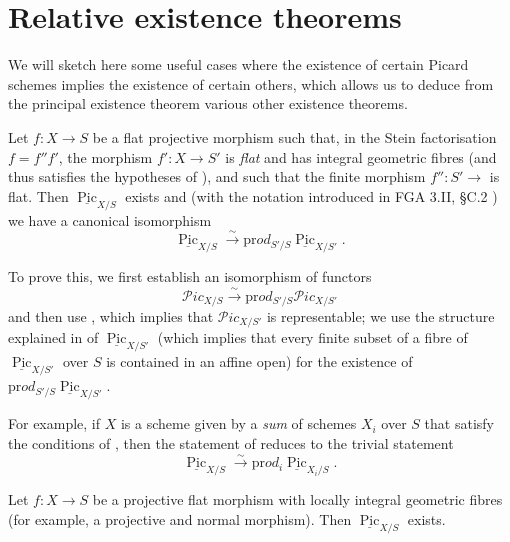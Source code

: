 \section{Relative existence theorems}\label{fga3.v-6}

We will sketch here some useful cases where the existence of certain Picard schemes implies the existence of certain others, which allows us to deduce from the principal existence theorem  various other existence theorems.


\begin{proposition}\label{fga3.v-6-proposition-6.1}
    Let $f\colon X\to S$ be a flat projective morphism such that, in the Stein factorisation $f=f''f'$, the morphism $f'\colon X\to S'$ is \emph{flat} and has integral geometric fibres (and thus satisfies the hypotheses of ), and such that the finite morphism $f''\colon S'\to$ is flat.
    Then $\underline{\operatorname{Pic}}_{X/S}$ exists and (with the notation introduced in FGA 3.II, §C.2 ) we have a canonical isomorphism
    \[
        \underline{\operatorname{Pic}}_{X/S}
        \xrightarrow{\sim} \mathrm{pr}od_{S'/S} \underline{\operatorname{Pic}}_{X/S'}.
    \]
\end{proposition}

\begin{cproof}
    To prove this, we first establish an isomorphism of functors
    \[
        \mathcal{P}ic_{X/S} \xrightarrow{\sim} \mathrm{pr}od_{S'/S} \mathcal{P}ic_{X/S'}
    \]
    and then use , which implies that $\mathcal{P}ic_{X/S'}$ is representable;
    we use the structure explained in  of $\underline{\operatorname{Pic}}_{X/S'}$ (which implies that every finite subset of a fibre of $\underline{\operatorname{Pic}}_{X/S'}$ over $S$ is contained in an affine open) for the existence of $\mathrm{pr}od_{S'/S}\underline{\operatorname{Pic}}_{X/S'}$.
\end{cproof}


For example, if $X$ is a scheme given by a \emph{sum} of schemes $X_i$ over $S$ that satisfy the conditions of , then the statement of  reduces to the trivial statement
\[
    \underline{\operatorname{Pic}}_{X/S}
    \xrightarrow{\sim} \mathrm{pr}od_i \underline{\operatorname{Pic}}_{X_i/S}.
\]

\begin{corollary}\label{fga3.v-6-corollary-6.2}
    Let $f\colon X\to S$ be a projective flat morphism with locally integral geometric fibres (for example, a projective and normal morphism).
    Then $\underline{\operatorname{Pic}}_{X/S}$ exists.
\end{corollary}


